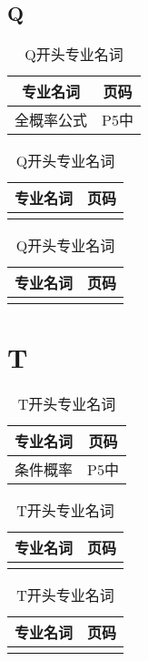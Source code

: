 \documentclass{wx672article}
\begin{document}
\begin{center}                  
  \section*{Q}                  
\end{center}
\label{sec:q}
\begin{table}[!ht] %
  \centering
  \begin{tabular}[t]{c|c} %
    \hline
    专业名词 &  页码   \\
    \hline
    全概率公式 & P5中 \\
    \hline
  \end{tabular}
  \hfill
  \begin{tabular}[t]{c|c}
    \hline
    专业名词  &  页码  \\
    \hline
              &  \\
    \hline
  \end{tabular}
  \hfill
  \begin{tabular}[t]{c|c}
    \hline
    专业名词 &  页码 \\
    \hline
             &  \\
    \hline
  \end{tabular}
  \caption{Q开头专业名词}\label{tabQ}
\end{table}



\section{T}

\label{sec:t}
\begin{table}[!ht] %
  \centering
  \begin{tabular}[t]{c|c} %
    \hline
    专业名词 &  页码   \\
    \hline
    条件概率 & P5中 \\
    \hline
  \end{tabular}
  \hfill
  \begin{tabular}[t]{c|c}
    \hline
    专业名词  &  页码  \\
    \hline
              &  \\
    \hline
  \end{tabular}
  \hfill
  \begin{tabular}[t]{c|c}
    \hline
    专业名词 &  页码 \\
    \hline
             &  \\
    \hline
  \end{tabular}
  \caption{T开头专业名词}\label{tabT}
\end{table}
\end{document}
